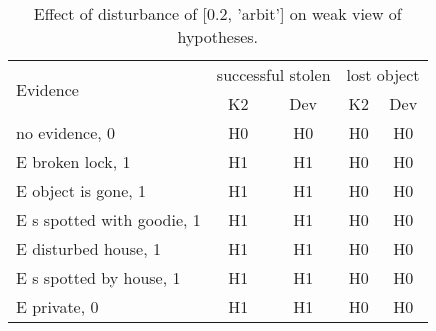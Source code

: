 \begin{table}\begin{tabular}{l|cc|cc}\toprule\multirow{2}{*}{Evidence} & \multicolumn{2}{c}{successful stolen}& \multicolumn{2}{c}{lost object}\\& {K2} & {Dev}& {K2} & {Dev}\\\midrule
no evidence, 0 & H0&H0&H0&H0\\E broken lock, 1 & H1&H1&H0&H0\\E object is gone, 1 & H1&H1&H0&H0\\E s spotted with goodie, 1 & H1&H1&H0&H0\\E disturbed house, 1 & H1&H1&H0&H0\\E s spotted by house, 1 & H1&H1&H0&H0\\E private, 0 & H1&H1&H0&H0\\\bottomrule\end{tabular}\caption{Effect of disturbance of [0.2, 'arbit'] on weak view of hypotheses.}\end{table}